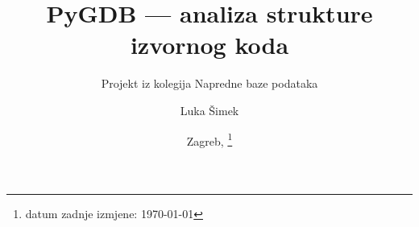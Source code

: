\documentclass[11pt]{scrartcl}
\date{\displaydate{date}}
\begin{document}
\title{PyGDB --- analiza strukture izvornog koda} \thispagestyle{empty}
\subtitle{Projekt iz kolegija Napredne baze podataka}
\author{Luka Šimek}
\date{Zagreb, \footnote{datum zadnje izmjene: \today}}
\maketitle
\bigskip
\tableofcontents
\clearpage
{}
\newpage


\newpage

\newpage

\newpage
\printbibliography
\end{document}
